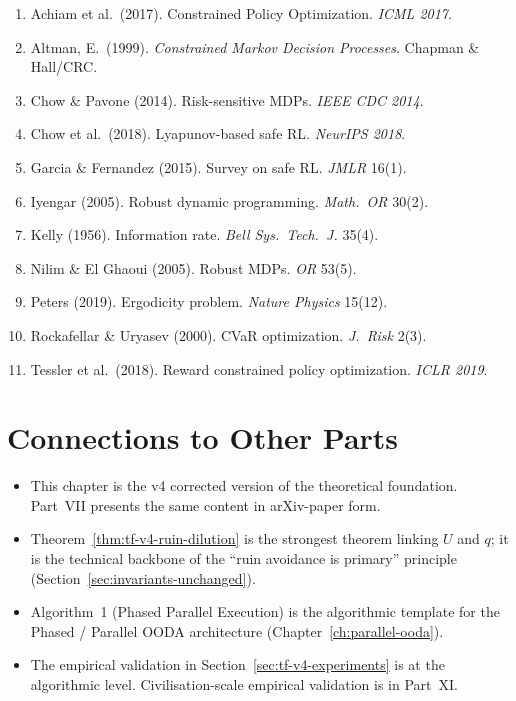 \begin{enumerate}
\item Achiam et al.~(2017). Constrained Policy Optimization.
\textit{ICML 2017}.
\item Altman, E.~(1999). \textit{Constrained Markov Decision
Processes}. Chapman \& Hall/CRC.
\item Chow \& Pavone (2014). Risk-sensitive MDPs.
\textit{IEEE CDC 2014}.
\item Chow et al.~(2018). Lyapunov-based safe RL. \textit{NeurIPS
2018}.
\item Garcia \& Fernandez (2015). Survey on safe RL.
\textit{JMLR} 16(1).
\item Iyengar (2005). Robust dynamic programming.
\textit{Math.~OR} 30(2).
\item Kelly (1956). Information rate. \textit{Bell Sys.~Tech.~J.}
35(4).
\item Nilim \& El Ghaoui (2005). Robust MDPs. \textit{OR} 53(5).
\item Peters (2019). Ergodicity problem. \textit{Nature Physics}
15(12).
\item Rockafellar \& Uryasev (2000). CVaR optimization.
\textit{J.~Risk} 2(3).
\item Tessler et al.~(2018). Reward constrained policy
optimization. \textit{ICLR 2019}.
\end{enumerate}

\section*{Connections to Other Parts}

\begin{itemize}
\item This chapter is the v4 corrected version of the theoretical
foundation. Part~VII presents the same content in arXiv-paper
form.
\item Theorem~\ref{thm:tf-v4-ruin-dilution} is the strongest theorem
linking $U$ and $q$; it is the technical backbone of the
``ruin avoidance is primary'' principle (Section~\ref{sec:invariants-unchanged}).
\item Algorithm~1 (Phased Parallel Execution) is the algorithmic
template for the Phased / Parallel OODA architecture
(Chapter~\ref{ch:parallel-ooda}).
\item The empirical validation in Section~\ref{sec:tf-v4-experiments}
is at the algorithmic level. Civilisation-scale empirical
validation is in Part~XI.
\end{itemize}
